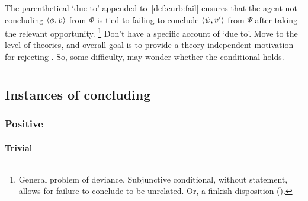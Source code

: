 \begin{note}
  The parenthetical `due to' appended to~\ref{def:curb:fail} ensures that the agent not concluding \(\langle \phi, v \rangle\) from \(\Phi\) is tied to failing to conclude \(\langle \psi, v' \rangle\) from \(\Psi\) after taking the relevant opportunity.%
  \footnote{
    General problem of deviance.
    Subjunctive conditional, without statement, allows for failure to conclude to be unrelated.
    Or, a finkish disposition (\cite[cf.][144]{Lewis:1997wg}).
  }
  Don't have a specific account of `due to'.
  Move to the level of theories, and overall goal is to provide a theory independent motivation for rejecting \issueConstraint{}.
  So, some difficulty, may wonder whether the conditional holds.
\end{note}

\section{}
\label{sec:illu3}

\subsection{Instances of concluding}
\label{sec:instances-concluding}

\subsubsection{Positive}
\label{sec:positive}

\paragraph{Trivial}

